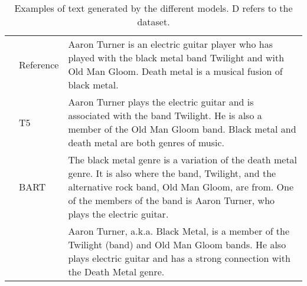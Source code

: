 \documentclass[11pt]{article}
\newcommand{\vertmulticell}[2]{\multirow{#1}{*}{\rotatebox[origin=c]{90}{#2}}}
\begin{document}
\begin{table}[t]
\begin{table*}[h]
\begin{center}
\begin{tabular}{llp{11cm}}
 \midrule
\vertmulticell{10}{WebNLG}  & Reference & Aaron Turner is an electric guitar player who has played with the black metal band Twilight and with Old Man Gloom. Death metal is a musical fusion of black metal.  \\
    & T5 & Aaron Turner plays the electric guitar and is associated with the band Twilight. He is also a member of the Old Man Gloom band. Black metal and death metal are both genres of music. \\
       & BART & The black metal genre is a variation of the death metal genre. It is also where the band, Twilight, and the alternative rock band, Old Man Gloom, are from. One of the members of the band is Aaron Turner, who plays the electric guitar. \\
   & \citet{harkous2020text} & Aaron Turner, a.k.a. Black Metal, is a member of the Twilight (band) and Old Man Gloom bands. He also plays electric guitar and has a strong connection with the Death Metal genre. \\
\midrule
\end{tabular} 
\caption{Examples of text generated by the different models. D refers to the dataset.}\label{tab:human_examples}
\end{center}
\end{table*} 


\end{table}
\end{document}
